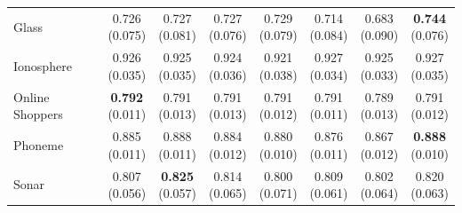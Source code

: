 {\begin{longtable}{lccccccc}
Glass & \makecell{0.726\\{\tiny (0.075)}} & \makecell{0.727\\{\tiny (0.081)}} & \makecell{0.727\\{\tiny (0.076)}} & \makecell{0.729\\{\tiny (0.079)}} & \makecell{0.714\\{\tiny (0.084)}} & \makecell{0.683\\{\tiny (0.090)}} & \makecell{\textbf{0.744}\\{\tiny (0.076)}} \\
Ionosphere & \makecell{0.926\\{\tiny (0.035)}} & \makecell{0.925\\{\tiny (0.035)}} & \makecell{0.924\\{\tiny (0.036)}} & \makecell{0.921\\{\tiny (0.038)}} & \makecell{0.927\\{\tiny (0.034)}} & \makecell{0.925\\{\tiny (0.033)}} & \makecell{0.927\\{\tiny (0.035)}} \\
Online Shoppers & \makecell{\textbf{0.792}\\{\tiny (0.011)}} & \makecell{0.791\\{\tiny (0.013)}} & \makecell{0.791\\{\tiny (0.013)}} & \makecell{0.791\\{\tiny (0.012)}} & \makecell{0.791\\{\tiny (0.011)}} & \makecell{0.789\\{\tiny (0.013)}} & \makecell{0.791\\{\tiny (0.012)}} \\
Phoneme & \makecell{0.885\\{\tiny (0.011)}} & \makecell{0.888\\{\tiny (0.011)}} & \makecell{0.884\\{\tiny (0.012)}} & \makecell{0.880\\{\tiny (0.010)}} & \makecell{0.876\\{\tiny (0.011)}} & \makecell{0.867\\{\tiny (0.012)}} & \makecell{\textbf{0.888}\\{\tiny (0.010)}} \\
Sonar & \makecell{0.807\\{\tiny (0.056)}} & \makecell{\textbf{0.825}\\{\tiny (0.057)}} & \makecell{0.814\\{\tiny (0.065)}} & \makecell{0.800\\{\tiny (0.071)}} & \makecell{0.809\\{\tiny (0.061)}} & \makecell{0.802\\{\tiny (0.064)}} & \makecell{0.820\\{\tiny (0.063)}} \\

\end{longtable}}

